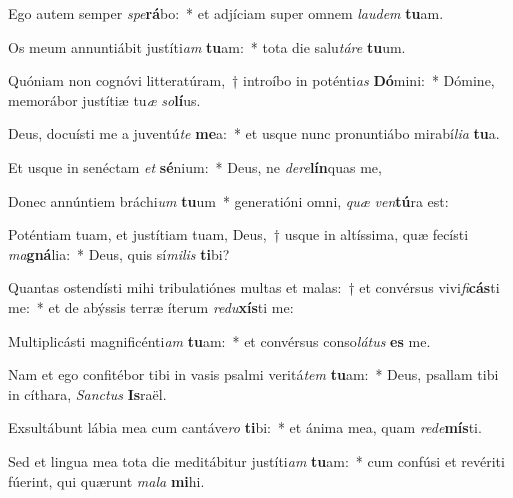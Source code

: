 \item Ego autem semper \textit{spe}\textbf{rá}bo:~* et adjíciam super omnem \textit{lau}\textit{dem} \textbf{tu}am.
\item Os meum annuntiábit justíti\textit{am} \textbf{tu}am:~* tota die salu\textit{tá}\textit{re} \textbf{tu}um.
\item Quóniam non cognóvi litteratúram,~† introíbo in poténti\textit{as} \textbf{Dó}mini:~* Dómine, memorábor justítiæ tu\textit{æ} \textit{so}\textbf{lí}us.
\item Deus, docuísti me a juventú\textit{te} \textbf{me}a:~* et usque nunc pronuntiábo mirabí\textit{li}\textit{a} \textbf{tu}a.
\item Et usque in senéctam \textit{et} \textbf{sé}nium:~* Deus, ne \textit{de}\textit{re}\textbf{lín}quas me,
\item Donec annúntiem bráchi\textit{um} \textbf{tu}um~* generatióni omni, \textit{quæ} \textit{ven}\textbf{tú}ra est:
\item Poténtiam tuam, et justítiam tuam, Deus,~† usque in altíssima, quæ fecísti \textit{ma}\textbf{gná}lia:~* Deus, quis sí\textit{mi}\textit{lis} \textbf{ti}bi?
\item Quantas ostendísti mihi tribulatiónes multas et malas:~† et convérsus vivi\textit{fi}\textbf{cás}ti me:~* et de abýssis terræ íterum \textit{re}\textit{du}\textbf{xís}ti me:
\item Multiplicásti magnificénti\textit{am} \textbf{tu}am:~* et convérsus conso\textit{lá}\textit{tus} \textbf{es} me.
\item Nam et ego confitébor tibi in vasis psalmi veritá\textit{tem} \textbf{tu}am:~* Deus, psallam tibi in cíthara, \textit{Sanc}\textit{tus} \textbf{Is}raël.
\item Exsultábunt lábia mea cum cantáve\textit{ro} \textbf{ti}bi:~* et ánima mea, quam \textit{red}\textit{e}\textbf{mís}ti.
\item Sed et lingua mea tota die meditábitur justíti\textit{am} \textbf{tu}am:~* cum confúsi et revériti fúerint, qui quærunt \textit{ma}\textit{la} \textbf{mi}hi.
